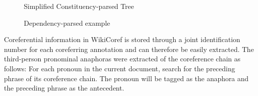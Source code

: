 \begin{figure}[h]
	\centering
	\caption{Simplified Constituency-parsed Tree }
	\label{figure:constituencytree}
\end{figure}

\begin{figure}[h]
	\centering
	\caption{Dependency-parsed example}
	\label{figure:dependencytree}
\end{figure}


Coreferential information in WikiCoref is stored through a joint identification number for each coreferring annotation and can therefore be easily extracted. The third-person pronominal anaphoras were extracted of the coreference chain as follows: For each pronoun in the current document, search for the preceding phrase of its coreference chain. The pronoun will be tagged as the anaphora and the preceding phrase as the antecedent. 

